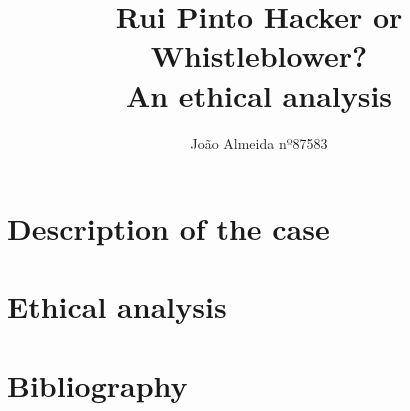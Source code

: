 \documentclass{article}
\title{Rui Pinto Hacker or Whistleblower? \\ An ethical analysis}
\author{João Almeida nº87583}
\begin{document}
\maketitle

\section{Description of the case}


\section{Ethical analysis}


\clearpage
\section{Bibliography}


\clearpage
\tableofcontents
\end{document}
